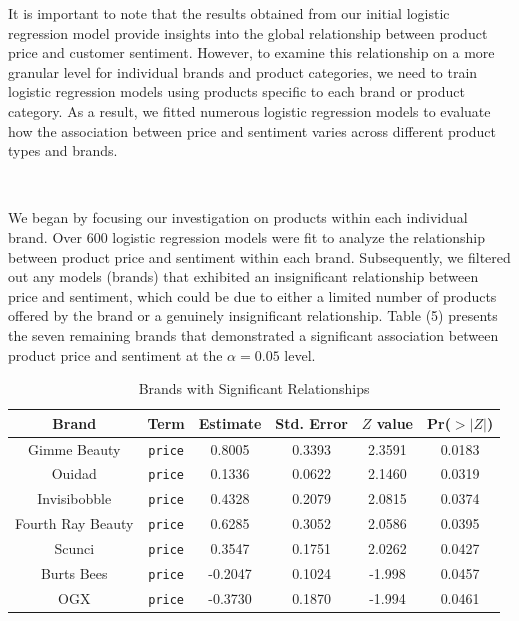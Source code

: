 \documentclass[10pt]{article}
\begin{document}
It is important to note that the results obtained from our initial logistic regression model provide insights into the global relationship between product price and customer sentiment. However, to examine this relationship on a more granular level for individual brands and product categories, we need to train logistic regression models using products specific to each brand or product category. As a result, we fitted numerous logistic regression models to evaluate how the association between price and sentiment varies across different product types and brands.

\

We began by focusing our investigation on products within each individual brand. Over 600 logistic regression models were fit to analyze the relationship between product price and sentiment within each brand. Subsequently, we filtered out any models (brands) that exhibited an insignificant relationship between price and sentiment, which could be due to either a limited number of products offered by the brand or a genuinely insignificant relationship. Table (5) presents the seven remaining brands that demonstrated a significant association between product price and sentiment at the $\alpha = 0.05$ level.

\begin{table}[h!]
    \centering
    \begin{tabular}{| c | c | c | c | c | c |} 
    \hline
    \textbf{Brand} &  \textbf{Term} &  \textbf{Estimate} &  \textbf{Std. Error} &  \textbf{$Z$ value} &  \textbf{Pr($>|Z|$)} \\ 
    \hline
    \hline
    Gimme Beauty & \texttt{price} & 0.8005 & 0.3393 & 2.3591 & 0.0183 \\
    \hline
    Ouidad & \texttt{price}	& 0.1336 & 0.0622 & 2.1460 & 0.0319\\
    \hline
    Invisibobble & \texttt{price} & 0.4328 & 0.2079 &  2.0815 & 0.0374 \\
    \hline
    Fourth Ray Beauty & \texttt{price} & 0.6285	& 0.3052 & 2.0586	& 0.0395 \\
    \hline
    Scunci & \texttt{price} & 0.3547 & 0.1751 & 2.0262 & 0.0427 \\
    \hline
    Burts Bees & \texttt{price}& -0.2047 & 0.1024 & -1.998 & 0.0457 \\
    \hline
    OGX	& \texttt{price} & -0.3730 & 0.1870 & -1.994 & 0.0461 \\ 
    \hline
    \end{tabular}
    \caption{Brands with Significant Relationships}
\end{table}
\end{document}

